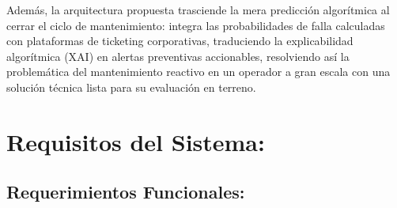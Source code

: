 \documentclass[12pt,a4paper]{article}
\begin{document}
\noindent
Además, la arquitectura propuesta trasciende la mera predicción algorítmica al cerrar el ciclo de mantenimiento:
integra las probabilidades de falla calculadas con plataformas de ticketing
corporativas, traduciendo la explicabilidad algorítmica (XAI) en alertas preventivas accionables,
resolviendo así la problemática del mantenimiento reactivo en un operador a gran escala con una solución técnica lista para su evaluación en terreno. 

 

    \section{Requisitos del Sistema:}  

        \subsection{\textbf{Requerimientos Funcionales:}}
\end{document}
